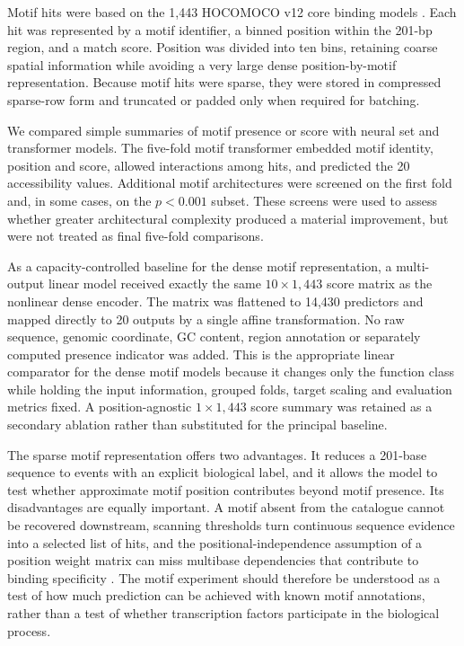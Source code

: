 \documentclass[a4paper,12pt]{article}
\begin{document}
Motif hits were based on the 1,443 HOCOMOCO v12 core binding models \citep{vorontsov2024hocomoco}. Each hit was represented by a motif identifier, a binned position within the 201-bp region, and a match score. Position was divided into ten bins, retaining coarse spatial information while avoiding a very large dense position-by-motif representation. Because motif hits were sparse, they were stored in compressed sparse-row form and truncated or padded only when required for batching.

We compared simple summaries of motif presence or score with neural set and transformer models. The five-fold motif transformer embedded motif identity, position and score, allowed interactions among hits, and predicted the 20 accessibility values. Additional motif architectures were screened on the first fold and, in some cases, on the $p<0.001$ subset. These screens were used to assess whether greater architectural complexity produced a material improvement, but were not treated as final five-fold comparisons.

As a capacity-controlled baseline for the dense motif representation, a multi-output linear model received exactly the same $10\times1{,}443$ score matrix as the nonlinear dense encoder. The matrix was flattened to 14,430 predictors and mapped directly to 20 outputs by a single affine transformation. No raw sequence, genomic coordinate, GC content, region annotation or separately computed presence indicator was added. This is the appropriate linear comparator for the dense motif models because it changes only the function class while holding the input information, grouped folds, target scaling and evaluation metrics fixed. A position-agnostic $1\times1{,}443$ score summary was retained as a secondary ablation rather than substituted for the principal baseline.

The sparse motif representation offers two advantages. It reduces a 201-base sequence to events with an explicit biological label, and it allows the model to test whether approximate motif position contributes beyond motif presence. Its disadvantages are equally important. A motif absent from the catalogue cannot be recovered downstream, scanning thresholds turn continuous sequence evidence into a selected list of hits, and the positional-independence assumption of a position weight matrix can miss multibase dependencies that contribute to binding specificity \citep{yang2015dnashape,jolma2015tfpairs}. The motif experiment should therefore be understood as a test of how much prediction can be achieved with known motif annotations, rather than a test of whether transcription factors participate in the biological process.
\end{document}
